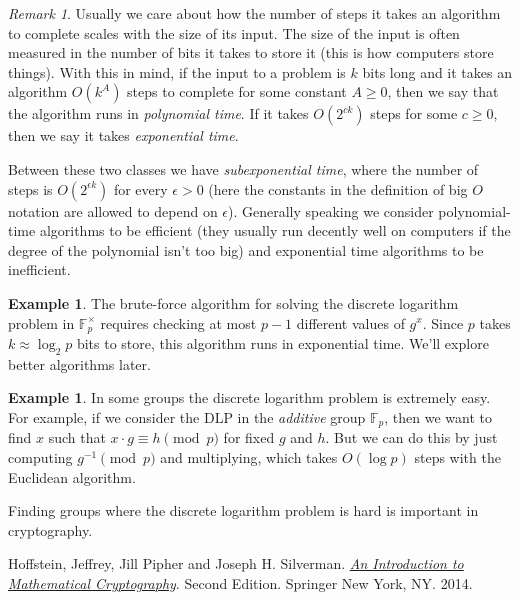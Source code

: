 \documentclass[12pt]{article}
\theoremstyle{plain}
\theoremstyle{definition}
\newtheorem{example}[theorem]{Example}
\theoremstyle{remark}
\newtheorem{remark}[theorem]{Remark}
\newcommand{\F}{\mathbb{F}}
\begin{document}
\begin{remark}
    Usually we care about how the number of steps it takes an algorithm to complete scales with the size of its input.
    The size of the input is often measured in the number of bits it takes to store it (this is how computers store things).
    With this in mind, if the input to a problem is $k$ bits long and it takes an algorithm $O(k^A)$ steps to complete for some constant $A \geq 0$, then we say that the algorithm runs in \emph{polynomial time}.
    If it takes $O(2^{ck})$ steps for some $c \geq 0$, then we say it takes \emph{exponential time}.

    Between these two classes we have \emph{subexponential time}, where the number of steps is $O(2^{\epsilon k})$ for every $\epsilon > 0$ (here the constants in the definition of big $O$ notation are allowed to depend on $\epsilon$).
    Generally speaking we consider polynomial-time algorithms to be efficient (they usually run decently well on computers if the degree of the polynomial isn't too big) and exponential time algorithms to be inefficient.
\end{remark}


\begin{example}
    The brute-force algorithm for solving the discrete logarithm problem in $\F_p^\times$ requires checking at most $p-1$ different values of $g^x$.
    Since $p$ takes $k \approx \log_2 p$ bits to store, this algorithm runs in exponential time.
    We'll explore better algorithms later.
\end{example}

\begin{example}
    In some groups the discrete logarithm problem is extremely easy.
    For example, if we consider the DLP in the \emph{additive} group $\F_p$, then we want to find $x$ such that $x\cdot g \equiv h\pmod p$ for fixed $g$ and $h$.
    But we can do this by just computing $g^{-1}\pmod p$ and multiplying, which takes $O(\log p)$ steps with the Euclidean algorithm.

    Finding groups where the discrete logarithm problem is hard is important in cryptography.
\end{example}



\begin{thebibliography}{13}

 Hoffstein, Jeffrey, Jill Pipher and Joseph H. Silverman. \href{https://link.springer.com/book/10.1007/978-1-4939-1711-2}{\textit{An Introduction to Mathematical Cryptography}}. Second Edition. Springer New York, NY. 2014.



 
\end{thebibliography}
\end{document}
